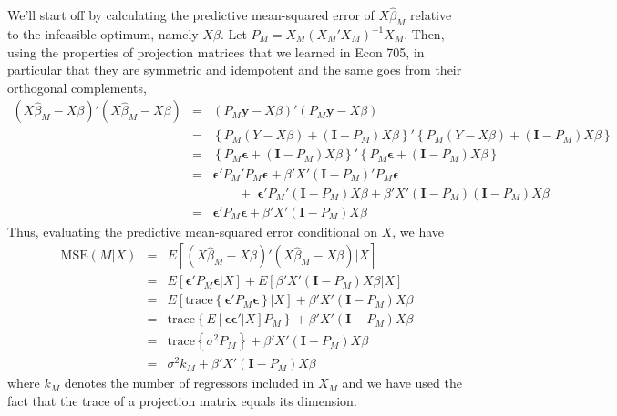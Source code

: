 \documentclass[12pt]{article}
\theoremstyle{definition}
\begin{document}
We'll start off by calculating the predictive mean-squared error of $X\widehat{\beta}_M$ relative to the infeasible optimum, namely $X\beta$. Let $P_M = X_M(X_M'X_M)^{-1}X_M$. Then, using the properties of projection matrices that we learned in Econ 705, in particular that they are symmetric and idempotent and the same goes from their orthogonal complements,
\begin{eqnarray*}
	(X\widehat{\beta}_M - X\beta)'(X\widehat{\beta}_M - X\beta) &=& (P_M \mathbf{y} - X\beta)'(P_M \mathbf{y} - X\beta)\\
		&=&\left\{P_M(Y-X\beta) + (\mathbf{I} - P_M)X\beta \right\}' \left\{P_M(Y-X\beta) + (\mathbf{I} - P_M)X\beta  \right\}\\
		&=&\left\{ P_M \boldsymbol{\epsilon} + (\mathbf{I}- P_M)X\beta\right\}'\left\{ P_M \boldsymbol{\epsilon} + (\mathbf{I}- P_M)X\beta \right\}\\
		&=&\boldsymbol{\epsilon}'P_M'P_M \boldsymbol{\epsilon} + \beta'X'(\mathbf{I}-P_M)'P_M\boldsymbol{\epsilon} \\
			&&\quad \quad + \;\boldsymbol{\epsilon}'P_M'(\mathbf{I} - P_M)X\beta + \beta'X' (\mathbf{I} - P_M)(\mathbf{I} - P_M)X\beta\\
		&=& \boldsymbol{\epsilon}'P_M \boldsymbol{\epsilon} + \beta'X'(\mathbf{I} - P_M)X\beta
\end{eqnarray*}
Thus, evaluating the predictive mean-squared error conditional on $X$, we have
	\begin{eqnarray*}
		\mbox{MSE}(M|X) &=& E\left[(X\widehat{\beta}_M - X\beta)'(X\widehat{\beta}_M - X\beta)|X \right]\\
		 &=& E\left[\boldsymbol{\epsilon}'P_M \boldsymbol{\epsilon}|X\right] + E\left[\beta'X'(\mathbf{I} - P_M)X\beta |X\right]\\
			&=&E\left[\mbox{trace}\left\{\boldsymbol{\epsilon}'P_M \boldsymbol{\epsilon}\right\}|X\right] + \beta'X'(\mathbf{I} - P_M)X\beta \\
		&=&\mbox{trace}\left\{E[\boldsymbol{\epsilon} \boldsymbol{\epsilon}'|X]P_M\right\} + \beta'X'(\mathbf{I} - P_M)X\beta \\
	&=&\mbox{trace}\left\{\sigma^2 P_M\right\} + \beta'X'(\mathbf{I} - P_M)X\beta \\
	&=& \sigma^2 k_M + \beta'X'(\mathbf{I} - P_M)X\beta
	\end{eqnarray*}
where $k_M$ denotes the number of regressors included in $X_M$ and we have used the fact that the trace of a projection matrix equals its dimension. 
\end{document}
